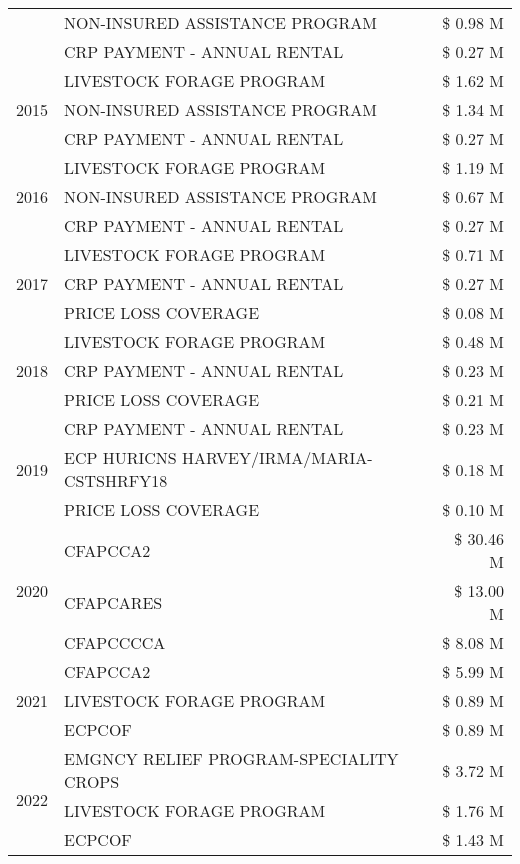 \begin{tabular}{llr}
 & NON-INSURED ASSISTANCE PROGRAM & \$ 0.98 M \\
 & CRP PAYMENT - ANNUAL RENTAL & \$ 0.27 M \\
\cline{1-3}
\multirow[t]{3}{*}{2015} & LIVESTOCK FORAGE PROGRAM & \$ 1.62 M \\
 & NON-INSURED ASSISTANCE PROGRAM & \$ 1.34 M \\
 & CRP PAYMENT - ANNUAL RENTAL & \$ 0.27 M \\
\cline{1-3}
\multirow[t]{3}{*}{2016} & LIVESTOCK FORAGE PROGRAM & \$ 1.19 M \\
 & NON-INSURED ASSISTANCE PROGRAM & \$ 0.67 M \\
 & CRP PAYMENT - ANNUAL RENTAL & \$ 0.27 M \\
\cline{1-3}
\multirow[t]{3}{*}{2017} & LIVESTOCK FORAGE PROGRAM & \$ 0.71 M \\
 & CRP PAYMENT - ANNUAL RENTAL & \$ 0.27 M \\
 & PRICE LOSS COVERAGE & \$ 0.08 M \\
\cline{1-3}
\multirow[t]{3}{*}{2018} & LIVESTOCK FORAGE PROGRAM & \$ 0.48 M \\
 & CRP PAYMENT - ANNUAL RENTAL & \$ 0.23 M \\
 & PRICE LOSS COVERAGE & \$ 0.21 M \\
\cline{1-3}
\multirow[t]{3}{*}{2019} & CRP PAYMENT - ANNUAL RENTAL & \$ 0.23 M \\
 & ECP HURICNS HARVEY/IRMA/MARIA-CSTSHRFY18 & \$ 0.18 M \\
 & PRICE LOSS COVERAGE & \$ 0.10 M \\
\cline{1-3}
\multirow[t]{3}{*}{2020} & CFAPCCA2 & \$ 30.46 M \\
 & CFAPCARES & \$ 13.00 M \\
 & CFAPCCCCA & \$ 8.08 M \\
\cline{1-3}
\multirow[t]{3}{*}{2021} & CFAPCCA2 & \$ 5.99 M \\
 & LIVESTOCK FORAGE PROGRAM & \$ 0.89 M \\
 & ECPCOF & \$ 0.89 M \\
\cline{1-3}
\multirow[t]{3}{*}{2022} & EMGNCY RELIEF PROGRAM-SPECIALITY CROPS & \$ 3.72 M \\
 & LIVESTOCK FORAGE PROGRAM & \$ 1.76 M \\
 & ECPCOF & \$ 1.43 M \\
\cline{1-3}
\bottomrule
\end{tabular}
